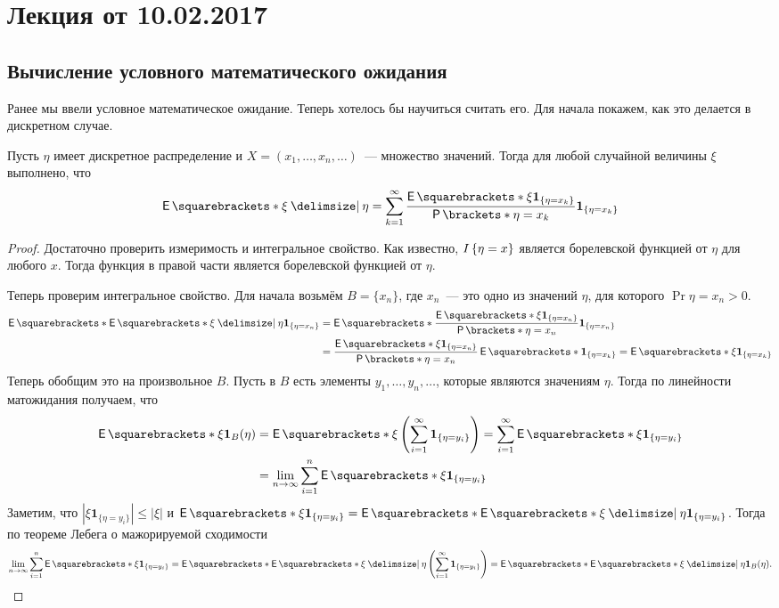 \section{Лекция от 10.02.2017}
\subsection{Вычисление условного математического ожидания}
Ранее мы ввели условное математическое ожидание. Теперь хотелось бы научиться считать его. Для начала покажем, как это делается в дискретном случае.
\begin{theorem}
	Пусть \(\eta\) имеет дискретное распределение и \(X = (x_1, \dots, x_n, 
	\dots)\)~--- множество значений. Тогда для любой случайной величины \(\xi\) 
	выполнено, что
	\[
		\E{\xi \given \eta} = \sum_{k = 1}^{\infty} 
		\frac{\E{\xi\mathbf{1}_{\{\eta = x_{k}\}}}}{\Pr{\eta = x_{k}}} 
		\mathbf{1}_{\{\eta = x_{k}\}}
	\]
\end{theorem}
\begin{proof}
	Достаточно проверить измеримость и интегральное свойство. Как известно, \(\\I\,\{\eta = x\}\) является борелевской функцией от \(\eta\) для любого \(x\). Тогда функция в правой части является борелевской функцией от \(\eta\).
	
	Теперь проверим интегральное свойство. Для начала возьмём \(B = \{x_n\}\), где \(x_n\)~--- это одно из значений \(\eta\), для которого \(\Pr{\eta = x_n} > 0\).
	\begin{align*}
		\E{\E{\xi \given \eta}\mathbf{1}_{\{\eta = x_{n}\}}} &= \E{\frac{\E{\xi 
		\mathbf{1}_{\{\eta = x_{n}\}}}}{\Pr{\eta = x_n}} \mathbf{1}_{\{\eta = 
		x_{n}\}}} \\
		&= \frac{\E{\xi\mathbf{1}_{\{\eta = x_{n}\}}}}{\Pr{\eta = 
		x_n}}\E{\mathbf{1}_{\{\eta = x_{k}\}}} = \E{\xi\mathbf{1}_{\{\eta = 
		x_{k}\}}}
	\end{align*}
	Теперь обобщим это на произвольное \(B\). Пусть в \(B\) есть элементы 
	\(y_{1}, \dots, y_{n}, \dots\), которые являются значениям \(\eta\). Тогда 
	по линейности матожидания получаем, что
	\begin{align*}
		\E{\xi\mathbf{1}_{B}(\eta)} &= \E{\xi\left(\sum_{i = 1}^{\infty} 
		\mathbf{1}_{\{\eta = y_{i}\}}\right)} = \sum_{i = 1}^{\infty} \E{\xi 
		\mathbf{1}_{\{\eta = y_{i}\}}} \\
		&= \lim\limits_{n \to \infty} \sum_{i = 1}^{n} \E{\xi 
		\mathbf{1}_{\{\eta = y_{i}\}}}
	\end{align*}
	Заметим, что \(|\xi \mathbf{1}_{\{\eta = y_{i}\}}| \leq |\xi|\) и \(\E{\xi 
	\mathbf{1}_{\{\eta = y_{i}\}}} = \E{\E{\xi \given \eta}\mathbf{1}_{\{\eta = 
	y_{i}\}}}\). Тогда по теореме Лебега о мажорируемой сходимости
	\[
		\lim\limits_{n \to \infty} \sum_{i = 1}^{n} \E{\xi \mathbf{1}_{\{\eta = 
		y_{i}\}}} = \E{\E{\xi \given \eta} \left(\sum_{i = 1}^{\infty} 
		\mathbf{1}_{\{\eta = y_{i}\}}\right)} = \E{\E{\xi \given \eta} 
		\mathbf{1}_{B}(\eta)}.\qedhere
	\]
\end{proof}

